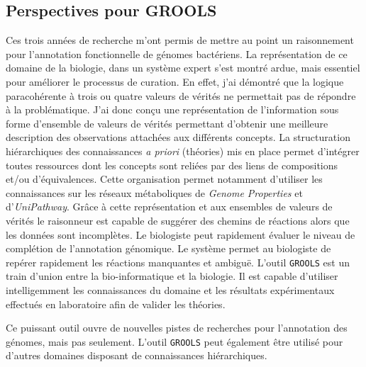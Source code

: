 
\begin{refsegment}
\chapter*{Perspectives pour GROOLS}

Ces trois années de recherche m'ont permis de mettre au point un raisonnement pour l'annotation fonctionnelle de génomes bactériens. La représentation de ce domaine de la biologie, dans un système expert s'est montré ardue, mais essentiel pour améliorer le processus de curation. En effet, j'ai démontré que la logique paracohérente à trois ou quatre valeurs de vérités ne permettait pas de répondre à la problématique. J'ai donc conçu une représentation de l'information sous forme d'ensemble de valeurs de vérités permettant d'obtenir une meilleure description des observations attachées aux différents concepts. La structuration hiérarchiques des connaissances \textit{a priori} (théories) mis en place permet d'intégrer toutes ressources dont les concepts sont reliées par des liens de compositions et/ou d'équivalences. Cette organisation permet notamment d'utiliser les connaissances sur les réseaux métaboliques  de \textit{Genome Properties} et d'\textit{UniPathway}. Grâce à cette représentation et aux ensembles de valeurs de vérités le raisonneur est capable de suggérer des chemins de réactions alors que les données sont incomplètes. Le biologiste peut rapidement évaluer le niveau de complétion de l'annotation génomique. Le système permet au biologiste de repérer rapidement les réactions manquantes et ambiguë. L'outil \texttt{GROOLS} est un train d'union entre la bio-informatique et la biologie. Il est capable d'utiliser intelligemment les connaissances du domaine et les résultats expérimentaux effectués en laboratoire afin de valider les théories.

Ce puissant outil ouvre de nouvelles pistes de recherches pour l'annotation des génomes, mais pas seulement. L'outil \texttt{GROOLS} peut également être utilisé pour d'autres domaines disposant de connaissances hiérarchiques.


\end{refsegment}
